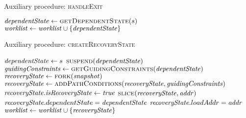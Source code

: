 \begin{algorithm}
  \caption{Auxiliary procedure: \textsc{handleExit}
  \label{fig:aux-func-recS}}
\begin{algorithmic}[1]

 \label{alg:exit-check-recovery}
  \State {} \label{alg:exit-terminate-recovery}
  \State $\dependentState \gets  \Call{getDependentState}{\workstate}$ \label{alg:exit-extract-dependent}
  \State {} \label{alg:exit-resume}
  \State $\mathit{worklist} \gets  \mathit{worklist} \cup \{\mathit{dependentState}\}$
\Else
  \State {}  \label{alg:exit-normal}
  \label{alg:push-worklist-exit}
\EndIf
\EndFunction
\end{algorithmic}
\end{algorithm}

\begin{algorithm}
  \caption{Auxiliary procedure: \textsc{createRecoveryState}
  \label{fig:aux-func-recS}}
\begin{algorithmic}[1]

   \label{alg:recover-foreach}
     \label{alg:recover-if-found}
       \State $\mathit{dependentState} \gets s$ \label{alg:recover-gen-depS}
       \State $\Call{suspend}{\dependentState}$ \label{alg:recover-suspend}
       \State $\gc \gets  \Call{getGuidingConstraints}{\dependentState}$ \label{alg:recover-get-gc}
       \State $\recoveryState \gets \Call{fork}{\snapshot}$ \label{alg:recover-gen-recS}
       \State $\recoveryState \gets \Call{addPathConditions}{\recoveryState,\gc}$ \label{alg:add-guiding-constraints}
       \State $\mathit{recoveryState}.\mathit{isRecoveryState} \gets \mathit{true}$ \label{alg:recover-set-is-recS}
       \State $\Call{slice}{\recoveryState,\addr}$ \label{alg:recover-slice}
       \State $\mathit{recoveryState}.dependentState = \mathit{dependentState}$ \label{alg:set-dependent-state}
       \State $\mathit{recoveryState}.loadAddr = \mathit{addr}$ \label{alg:set-load-addr}
       \State $\mathit{worklist} \gets \mathit{worklist} \cup \{\mathit{recoveryState}\}$
       \label{alg:push-worklist-recovery}
    \EndIf
  \EndFor
\EndFunction
\end{algorithmic}
\end{algorithm}

